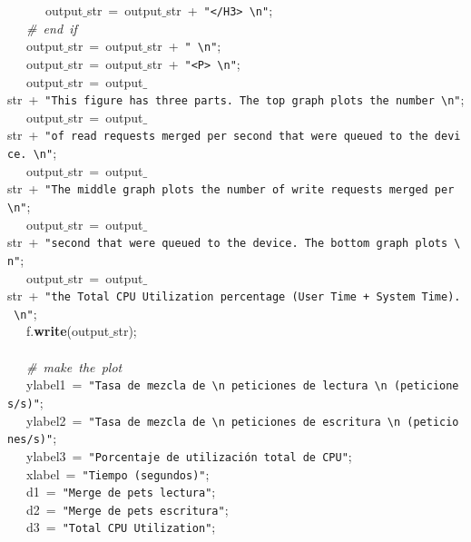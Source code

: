 \mbox{}\ \ \ \ \ \ output$\_$str\ =\ output$\_$str\ +\ \texttt{"{}\textless{}/H3\textgreater{}\ \textbackslash{}n"{}}; \\
\mbox{}\ \ \ \textit{\#\ end\ if} \\
\mbox{}\ \ \ output$\_$str\ =\ output$\_$str\ +\ \texttt{"{}\ \textbackslash{}n"{}}; \\
\mbox{}\ \ \ output$\_$str\ =\ output$\_$str\ +\ \texttt{"{}\textless{}P\textgreater{}\ \textbackslash{}n"{}}; \\
\mbox{}\ \ \ output$\_$str\ =\ output$\_$str\ +\ \texttt{"{}This\ figure\ has\ three\ parts.\ The\ top\ graph\ plots\ the\ number\ \textbackslash{}n"{}}; \\
\mbox{}\ \ \ output$\_$str\ =\ output$\_$str\ +\ \texttt{"{}of\ read\ requests\ merged\ per\ second\ that\ were\ queued\ to\ the\ device.\ \textbackslash{}n"{}}; \\
\mbox{}\ \ \ output$\_$str\ =\ output$\_$str\ +\ \texttt{"{}The\ middle\ graph\ plots\ the\ number\ of\ write\ requests\ merged\ per\ \textbackslash{}n"{}}; \\
\mbox{}\ \ \ output$\_$str\ =\ output$\_$str\ +\ \texttt{"{}second\ that\ were\ queued\ to\ the\ device.\ The\ bottom\ graph\ plots\ \textbackslash{}n"{}}; \\
\mbox{}\ \ \ output$\_$str\ =\ output$\_$str\ +\ \texttt{"{}the\ Total\ CPU\ Utilization\ percentage\ (User\ Time\ +\ System\ Time).\ \textbackslash{}n"{}}; \\
\mbox{}\ \ \ f.\textbf{write}(output$\_$str); \\
\mbox{}\ \ \  \\
\mbox{}\ \ \ \textit{\#\ make\ the\ plot} \\
\mbox{}\ \ \ ylabel1\ =\ \texttt{"{}Tasa\ de\ mezcla\ de\ \textbackslash{}n\ peticiones\ de\ lectura\ \textbackslash{}n\ (peticiones/s)"{}}; \\
\mbox{}\ \ \ ylabel2\ =\ \texttt{"{}Tasa\ de\ mezcla\ de\ \textbackslash{}n\ peticiones\ de\ escritura\ \textbackslash{}n\ (peticiones/s)"{}}; \\
\mbox{}\ \ \ ylabel3\ =\ \texttt{"{}Porcentaje\ de\ utilización\ total\ de\ CPU"{}}; \\
\mbox{}\ \ \ xlabel\ =\ \texttt{"{}Tiempo\ (segundos)"{}}; \\
\mbox{}\ \ \ d1\ =\ \texttt{"{}Merge\ de\ pets\ lectura"{}}; \\
\mbox{}\ \ \ d2\ =\ \texttt{"{}Merge\ de\ pets\ escritura"{}}; \\
\mbox{}\ \ \ d3\ =\ \texttt{"{}Total\ CPU\ Utilization"{}}; \\
